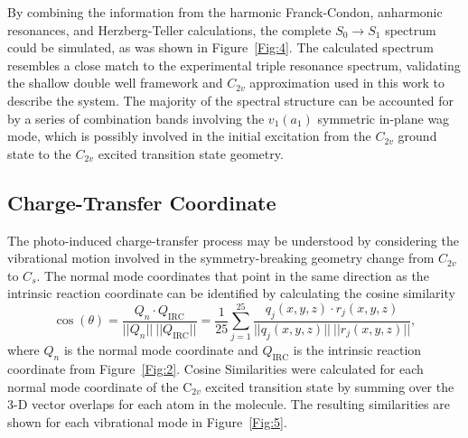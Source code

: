 \documentclass[journal=jpcafh,manuscript=article,layout=onecolumn, 12pt]{achemso}
\begin{document}
By combining the information from the harmonic Franck-Condon, anharmonic resonances, and Herzberg-Teller calculations, the complete $S_0\rightarrow S_1$ spectrum could be simulated, as was shown in Figure~\ref{Fig:4}. The calculated spectrum resembles a close match to the experimental triple resonance spectrum, validating the shallow double well framework and $C_{2v}$ approximation used in this work to describe the system. The majority of the spectral structure can be accounted for by a series of combination bands involving the $v_1(a_1)$ symmetric in-plane wag mode, which is possibly involved in the initial excitation from the $C_{2v}$ ground state to the $C_{2v}$ excited transition state geometry. 

\subsection{Charge-Transfer Coordinate}
The photo-induced charge-transfer process may be understood by considering the vibrational motion involved in the symmetry-breaking geometry change from $C_{2v}$ to $C_s$. The normal mode coordinates that point in the same direction as the intrinsic reaction coordinate can be identified by calculating the cosine similarity
\begin{equation}
	\cos(\theta) = \frac{Q_n\cdot Q_{\text{IRC}}}{||Q_n||~||Q_{\text{IRC}}||} = \frac{1}{25} \displaystyle\sum_{j=1}^{25}\frac{q_j(x,y,z)\cdot r_j(x,y,z)}{||q_j(x,y,z)||~||r_j(x,y,z)||},
\end{equation}
where $Q_n$ is the normal mode coordinate and $Q_{\text{IRC}}$ is the intrinsic reaction coordinate from Figure~\ref{Fig:2}. Cosine Similarities were calculated for each normal mode coordinate of the C$_{2v}$ excited transition state by summing over the 3-D vector overlaps for each atom in the molecule. The resulting similarities are shown for each vibrational mode in Figure~\ref{Fig:5}.
\end{document}
